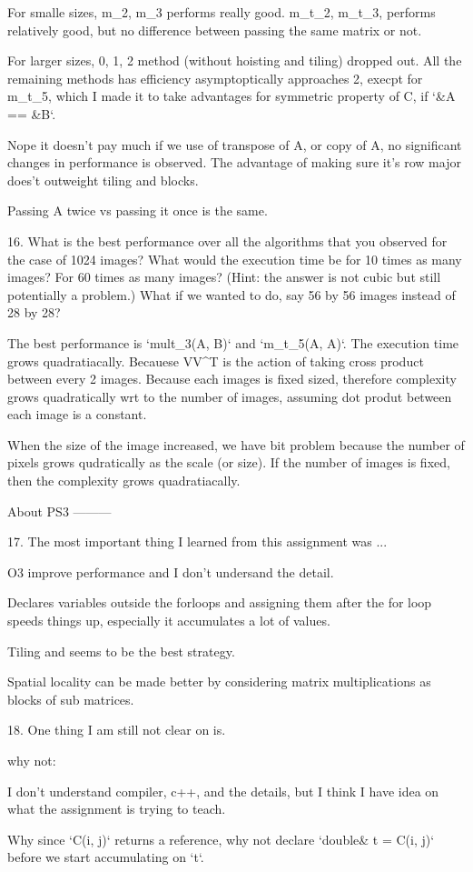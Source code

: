\documentclass[]{article}
\begin{document}
For smalle sizes, m_2, m_3 performs really good. m_t_2, m_t_3, performs relatively good, but no difference between passing the same matrix or not. 

For larger sizes, 0, 1, 2 method (without hoisting and tiling) dropped out. All the remaining methods has efficiency asymptoptically approaches 2, execpt for m_t_5, which I made it to take advantages for symmetric property of C, if `&A == &B`. 

Nope it doesn't pay much if we use of transpose of A, or copy of A, no significant changes in performance is observed. The advantage of making sure it's row major does't outweight tiling and blocks. 

Passing A twice vs passing it once is the same. 

16. What is the best performance over all the algorithms that you observed for the case of 1024 images?  What would the execution time be for 10 times as many images?  For 60 times as many images?  (Hint: the answer is not cubic but still potentially a problem.)  What if we wanted to do, say 56 by 56 images instead of 28 by 28?

The best performance is `mult_3(A, B)` and `m_t_5(A, A)`. The execution time grows quadratiacally. Becauese VV^T is the action of taking cross product between every 2 images. Because each images is fixed sized, therefore complexity grows quadratically wrt to the number of images, assuming dot produt between each image is a constant. 

When the size of the image increased, we have bit problem because the number of pixels grows qudratically as the scale (or size). If the number of images  is fixed, then the complexity grows quadratiacally.  


About PS3
---------

17. The most important thing I learned from this assignment was ...  

O3 improve performance and I don't undersand the detail. 

Declares variables outside the forloops and assigning them after the for loop speeds things up, especially it accumulates a lot of values. 

Tiling and seems to be the best strategy. 

Spatial locality can be made better by considering matrix multiplications as blocks of sub matrices. 


18. One thing I am still not clear on is. 

why not:

I don't understand compiler, c++, and the details, but I think I have idea on what the assignment is trying to teach. 

Why since `C(i, j)` returns a reference, why not declare `double& t = C(i, j)` before we start accumulating on `t`.
\end{document}

